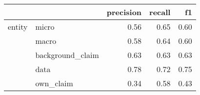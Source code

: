 \begin{tabular}{llrrr}
\toprule
       &           &  precision &  recall &   f1 \\
\midrule
entity & micro &       0.56 &    0.65 & 0.60 \\
       & macro &       0.58 &    0.64 & 0.60 \\
       & background\_claim &       0.63 &    0.63 & 0.63 \\
       & data &       0.78 &    0.72 & 0.75 \\
       & own\_claim &       0.34 &    0.58 & 0.43 \\
\bottomrule
\end{tabular}
